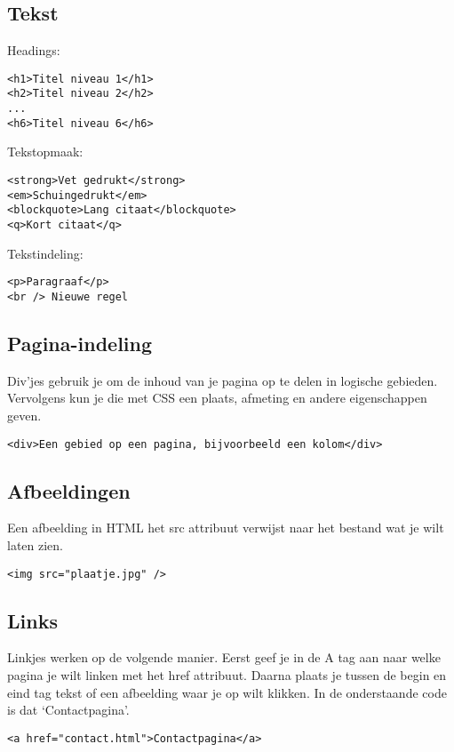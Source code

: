\documentclass[8pt,pagesize,footinclude=false,headinclude=false]{scrartcl}
\begin{document}
\begin{multicols*}{4}
\subsection*{Tekst}
Headings:
\begin{lstlisting}
<h1>Titel niveau 1</h1>
<h2>Titel niveau 2</h2>
...
<h6>Titel niveau 6</h6>
\end{lstlisting}

\noindent Tekstopmaak:
\begin{lstlisting}
<strong>Vet gedrukt</strong>
<em>Schuingedrukt</em>
<blockquote>Lang citaat</blockquote>
<q>Kort citaat</q>
\end{lstlisting}

\noindent Tekstindeling:
\begin{lstlisting}
<p>Paragraaf</p>
<br /> Nieuwe regel
\end{lstlisting}

\subsection*{Pagina-indeling}
Div'jes gebruik je om de inhoud van je pagina op te delen in logische gebieden. Vervolgens kun je die met CSS een plaats, afmeting en andere eigenschappen geven. 
\begin{lstlisting}
<div>Een gebied op een pagina, bijvoorbeeld een kolom</div>
\end{lstlisting}

\subsection*{Afbeeldingen}
Een afbeelding in HTML het src attribuut verwijst naar het bestand wat je wilt laten zien.
\begin{lstlisting}
<img src="plaatje.jpg" />
\end{lstlisting}

\subsection*{Links}
Linkjes werken op de volgende manier. Eerst geef je in de A tag aan naar welke pagina je wilt linken met het href attribuut. Daarna plaats je tussen de begin en eind tag tekst of een afbeelding waar je op wilt klikken. In de onderstaande code is dat `Contactpagina'.

\begin{lstlisting}
<a href="contact.html">Contactpagina</a>
\end{lstlisting}


\end{multicols*}
\end{document}
